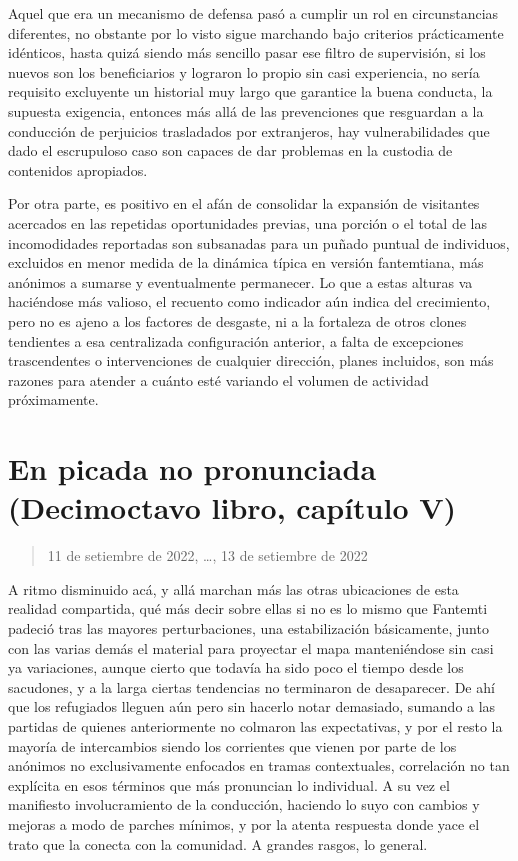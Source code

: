 \documentclass[
]{book}
\begin{document}
Aquel que era un mecanismo de defensa pasó a cumplir un rol en circunstancias diferentes, no obstante por lo visto sigue marchando bajo criterios prácticamente idénticos, hasta quizá siendo más sencillo pasar ese filtro de supervisión, si los nuevos son los beneficiarios y lograron lo propio sin casi experiencia, no sería requisito excluyente un historial muy largo que garantice la buena conducta, la supuesta exigencia, entonces más allá de las prevenciones que resguardan a la conducción de perjuicios trasladados por extranjeros, hay vulnerabilidades que dado el escrupuloso caso son capaces de dar problemas en la custodia de contenidos apropiados.

Por otra parte, es positivo en el afán de consolidar la expansión de visitantes acercados en las repetidas oportunidades previas, una porción o el total de las incomodidades reportadas son subsanadas para un puñado puntual de individuos, excluidos en menor medida de la dinámica típica en versión fantemtiana, más anónimos a sumarse y eventualmente permanecer. Lo que a estas alturas va haciéndose más valioso, el recuento como indicador aún indica del crecimiento, pero no es ajeno a los factores de desgaste, ni a la fortaleza de otros clones tendientes a esa centralizada configuración anterior, a falta de excepciones trascendentes o intervenciones de cualquier dirección, planes incluidos, son más razones para atender a cuánto esté variando el volumen de actividad próximamente.

\hypertarget{en-picada-no-pronunciada-decimoctavo-libro-capuxedtulo-v}{%
\section{En picada no pronunciada (Decimoctavo libro, capítulo V)}\label{en-picada-no-pronunciada-decimoctavo-libro-capuxedtulo-v}}

\begin{quote}
11 de setiembre de 2022, \ldots, 13 de setiembre de 2022
\end{quote}

A ritmo disminuido acá, y allá marchan más las otras ubicaciones de esta realidad compartida, qué más decir sobre ellas si no es lo mismo que Fantemti padeció tras las mayores perturbaciones, una estabilización básicamente, junto con las varias demás el material para proyectar el mapa manteniéndose sin casi ya variaciones, aunque cierto que todavía ha sido poco el tiempo desde los sacudones, y a la larga ciertas tendencias no terminaron de desaparecer. De ahí que los refugiados lleguen aún pero sin hacerlo notar demasiado, sumando a las partidas de quienes anteriormente no colmaron las expectativas, y por el resto la mayoría de intercambios siendo los corrientes que vienen por parte de los anónimos no exclusivamente enfocados en tramas contextuales, correlación no tan explícita en esos términos que más pronuncian lo individual. A su vez el manifiesto involucramiento de la conducción, haciendo lo suyo con cambios y mejoras a modo de parches mínimos, y por la atenta respuesta donde yace el trato que la conecta con la comunidad. A grandes rasgos, lo general.
\end{document}
